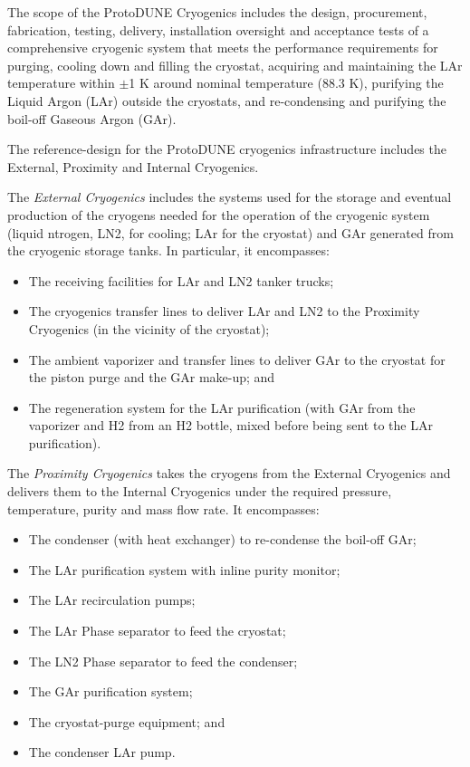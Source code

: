 The scope of the ProtoDUNE Cryogenics includes the design, procurement, fabrication, testing, delivery, installation oversight and acceptance tests of a comprehensive cryogenic system that meets the performance requirements for purging, cooling down and filling the cryostat, acquiring and maintaining the LAr temperature within $\pm$1 K around nominal temperature (88.3 K), purifying the Liquid Argon (LAr) outside the cryostats, and re-condensing and purifying the boil-off Gaseous Argon (GAr).

The reference-design for the ProtoDUNE cryogenics infrastructure includes the External, Proximity and Internal Cryogenics.

%
The \textit{External Cryogenics} includes the systems used for the storage and eventual production of the cryogens needed for the operation of the cryogenic system (liquid ntrogen, LN2, for cooling; LAr for the cryostat) and GAr generated from the cryogenic storage tanks. In particular, it encompasses:
%
\begin{itemize}
\item The receiving facilities for LAr and LN2 tanker trucks;
\item The cryogenics transfer lines to deliver LAr and LN2 to the Proximity Cryogenics (in the vicinity of the cryostat);
\item The ambient vaporizer and transfer lines to deliver GAr to the cryostat for the piston purge and the GAr make-up; and
\item The regeneration system for the LAr purification (with GAr from the vaporizer and H2 from an H2 bottle, mixed before being sent to the LAr purification).
\end{itemize}
%
The \textit{Proximity Cryogenics} takes the cryogens from the External Cryogenics and delivers them to the Internal Cryogenics under the required pressure, temperature, purity and mass flow rate. It encompasses:
%
\begin{itemize}
\item The condenser (with heat exchanger) to re-condense the boil-off GAr;
\item The LAr purification system with inline purity monitor;
\item The LAr recirculation pumps;
\item The LAr Phase separator to feed the cryostat;
\item The LN2 Phase separator to feed the condenser;
\item The GAr purification system;
\item The cryostat-purge equipment; and
\item The condenser LAr pump.
\end{itemize}
